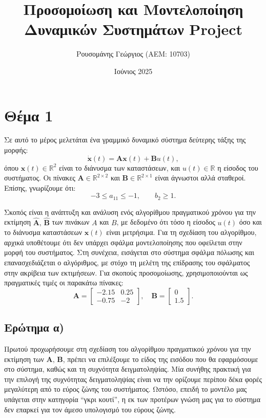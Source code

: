 \documentclass[a4paper,12pt]{article}
\title{Προσομοίωση και Μοντελοποίηση \newline Δυναμικών Συστημάτων \newline 
\selectlanguage{english}Project\selectlanguage{greek}}
\author{Ρουσομάνης Γεώργιος (ΑΕΜ: 10703)}
\date{Ιούνιος 2025}
\begin{document}
\maketitle

\section*{Θέμα 1}

Σε αυτό το μέρος μελετάται ένα γραμμικό δυναμικό σύστημα δεύτερης τάξης της μορφής:
\begin{equation}
\dot{\mathbf{x}}(t) = \mathbf{A} \mathbf{x}(t) + \mathbf{B} u(t),
\label{eq:state_space_form}
\end{equation}
όπου $\mathbf{x}(t) \in \mathbb{R}^2$ είναι το διάνυσμα των καταστάσεων, και $u(t) \in \mathbb{R}$ 
η είσοδος του συστήματος. Οι πίνακες $\mathbf{A} \in \mathbb{R}^{2 \times 2}$ και 
$\mathbf{B} \in \mathbb{R}^{2 \times 1}$ είναι άγνωστοι αλλά σταθεροί. Επίσης, γνωρίζουμε ότι:
\begin{equation}
-3 \leq a_{11} \leq -1, \quad \quad b_2 \geq 1.
\label{eq:restrictions}
\end{equation}

Σκοπός είναι η ανάπτυξη και ανάλυση ενός αλγορίθμου πραγματικού χρόνου για την εκτίμηση  
$\hat{\mathbf{A}},\,\hat{\mathbf{B}}$ των πινάκων $A$ και $B$, με δεδομένο ότι τόσο η είσοδος 
$u(t)$ όσο και το διάνυσμα καταστάσεων $\mathbf{x}(t)$ είναι μετρήσιμα. Για τη σχεδίαση του 
αλγορίθμου, αρχικά υποθέτουμε ότι δεν υπάρχει σφάλμα μοντελοποίησης που οφείλεται στην μορφή του 
συστήματος. Στη συνέχεια, εισάγεται στο σύστημα σφάλμα πόλωσης και επανασχεδιάζεται ο αλγόριθμος, 
με στόχο τη μελέτη της επίδρασης του σφάλματος στην ακρίβεια των εκτιμήσεων. Για σκοπούς 
προσομοίωσης, χρησιμοποιούνται ως πραγματικές τιμές οι παρακάτω πίνακες:
\[
\mathbf{A} = 
\begin{bmatrix}
-2.15 & 0.25 \\
-0.75 & -2
\end{bmatrix}, \quad
\mathbf{B} = 
\begin{bmatrix}
0 \\
1.5
\end{bmatrix}.
\]

\subsection*{Ερώτημα α)}

Πρωτού προχωρήσουμε στη σχεδίαση του αλγορίθμου πραγματικού χρόνου για την εκτίμηση των 
$\mathbf{A}, \, \mathbf{B}$, πρέπει να επιλέξουμε το είδος της εισόδου που θα εφαρμόσουμε 
στο σύστημα, καθώς και τη συχνότητα δειγματοληψίας. Μία συνήθης πρακτική για την επιλογή της 
συχνότητας δειγματοληψίας είναι να την ορίζουμε περίπου δέκα φορές μεγαλύτερη από το εύρος 
ζώνης του συστήματος. Ωστόσο, επειδή το μοντέλο μας υπάγεται στην κατηγορία ``γκρι κουτί'', 
η εκ των προτέρων γνώση μας για το σύστημα δεν επαρκεί για τον άμεσο υπολογισμό του εύρους ζώνης.
\end{document}
